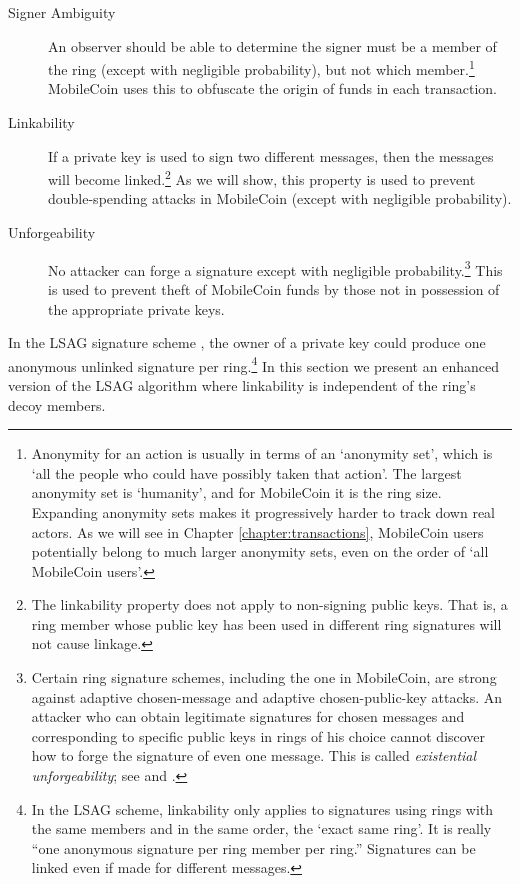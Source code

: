 \begin{description}
	\item[Signer Ambiguity]
	An observer should be able to determine the signer must be a member of the ring (except with negligible probability), but not which member.\footnote{\label{anonymity_note}Anonymity for an action is usually in terms of an `anonymity set’, which is `all the people who could have possibly taken that action’. The largest anonymity set is `humanity’, and for MobileCoin it is the ring size. Expanding anonymity sets makes it progressively harder to track down real actors. As we will see in Chapter \ref{chapter:transactions}, MobileCoin users potentially belong to much larger anonymity sets, even on the order of `all MobileCoin users'.} MobileCoin uses this to obfuscate the origin of funds in each transaction.

	\item[Linkability]
	If a private key is used to sign two different messages, then the messages will become linked.\footnote{\label{linkability_note}The linkability property does not apply to non-signing public keys. That is, a ring member whose public key has been used in different ring signatures will not cause linkage.} As we will show, this property is used to prevent double-spending attacks in MobileCoin (except with negligible probability).

	\item[Unforgeability]
    No attacker can forge a signature except with negligible probability.\footnote{Certain ring signature schemes, including the one in MobileCoin, are strong against adaptive chosen-message and adaptive chosen-public-key attacks. An attacker who can obtain legitimate signatures for chosen messages and corresponding to specific public keys in rings of his choice cannot discover how to forge the signature of even one message. This is called {\em existential unforgeability}; see \cite{MRL-0005-ringct} and \cite{Liu2004}.} This is used to prevent theft of MobileCoin funds by those not in possession of the appropriate private keys.
\end{description}

In the LSAG signature scheme \cite{Liu2004}, the owner of a private key could produce one anonymous unlinked signature per ring.\footnote{\label{lsag_linkability_note}In the LSAG scheme, linkability only applies to signatures using rings with the same members and in the same order, the `exact same ring'. It is really ``one anonymous signature per ring member per ring.” Signatures can be linked even if made for different messages.} In this section we present an enhanced version of the LSAG algorithm where linkability is independent of the ring’s decoy members.

